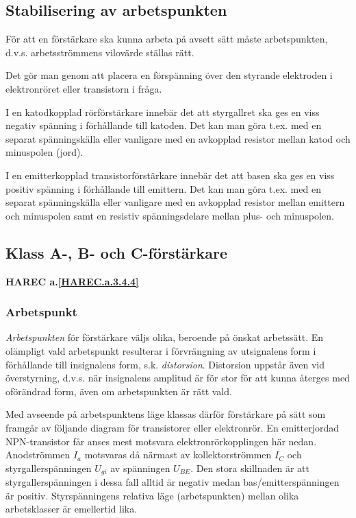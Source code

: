 

\subsection{Stabilisering av arbetspunkten}

För att en förstärkare ska kunna arbeta på avsett sätt måste
arbetspunkten, d.v.s. arbetsströmmens vilovärde ställas rätt.

Det gör man genom att placera en förspänning över den styrande
elektroden i elektronröret eller transistorn i fråga.

I en katodkopplad rörförstärkare innebär det att styrgallret ska
ges en viss negativ spänning i förhållande till katoden. Det kan man
göra t.ex. med en separat spänningskälla eller vanligare med en
avkopplad resistor mellan katod och minuspolen (jord).

I en emitterkopplad transistorförstärkare innebär det att basen ska
ges en viss positiv spänning i förhållande till emittern. Det kan man
göra t.ex. med en separat spänningskälla eller vanligare med en
avkopplad resistor mellan emittern och minuspolen samt en resistiv
spänningsdelare mellan plus- och minuspolen.

\subsection{Klass A-, B- och C-förstärkare}
\textbf{HAREC a.\ref{HAREC.a.3.4.4}\label{myHAREC.a.3.4.4}}

\subsubsection{Arbetspunkt}

\emph{Arbetspunkten} för förstärkare väljs olika, beroende på önskat
arbetssätt. En olämpligt vald arbetspunkt resulterar i förvrängning av
utsignalens form i förhållande till insignalens form,
s.k. \emph{distorsion}. Distorsion uppstår även vid överstyrning,
d.v.s. när insignalens amplitud är för stor för att kunna återges med
oförändrad form, även om arbetspunkten är rätt vald.

Med avseende på arbetspunktens läge klassas därför förstärkare på sätt
som framgår av följande diagram för transistorer eller elektronrör.
En emitterjordad NPN-transistor får anses mest motsvara
elektronrörkopplingen här nedan.
Anodströmmen \(I_a\) motsvaras då närmast av kollektorströmmen
\(I_C\) och styrgallerspänningen \(U_{gi}\) av spänningen
\(U_{BE}\).
Den stora skillnaden är att styrgallerspänningen i dessa
fall alltid är negativ medan bas/emitterspänningen är positiv.
Styrspänningens relativa läge (arbetspunkten) mellan olika
arbetsklasser är emellertid lika.

